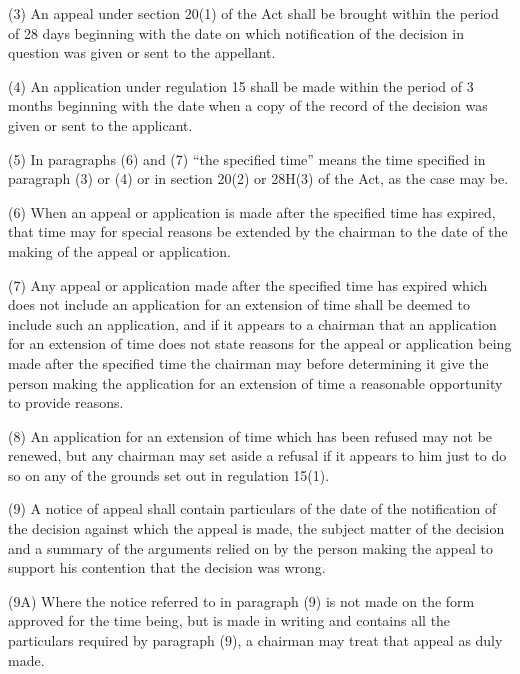 \documentclass[a4paper]{article}
\begin{document}
(3) An appeal under section 20(1) of the Act shall be brought within the period of 28 days beginning with the date on which notification of the decision in question was given or sent to the appellant.

(4) An application under regulation 15 shall be made within the period of 3 months beginning with the date when a copy of the record of the decision was given or sent to the applicant.

(5) In paragraphs (6) and (7) “the specified time” means the time specified in paragraph (3) or
(4) or in section 20(2) or 28H(3) of the Act, as the case may be.  %

(6) When an appeal or application is made after the specified time has expired, that time may for special reasons be extended by the chairman to the date of the making of the appeal or application.

(7) Any appeal or application made after the specified time has expired which does not include an application for an extension of time shall be deemed to include such an application, and if it appears to a chairman that an application for an extension of time does not state reasons for the appeal or application being made after the specified time the chairman may before determining it give the person making the application for an extension of time a reasonable opportunity to provide reasons.

(8) An application for an extension of time which has been refused may not be renewed, but any chairman may set aside a refusal if it appears to him just to do so on any of the grounds set out in regulation 15(1).


(9) A notice of appeal shall contain particulars of the date of the notification of the decision against which the appeal is made, the subject matter of the decision and a summary of the arguments relied on by the person making the appeal to support his contention that the decision was wrong.

(9A) Where the notice referred to in paragraph (9) is not made on the form approved for the time being, but is made in writing and contains all the particulars required by paragraph (9), a chairman may treat that appeal as duly made.
\end{document}
